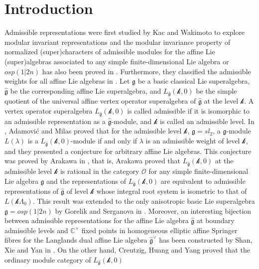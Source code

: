 \documentclass[12pt]{article}
\begin{document}
\section{Introduction}
Admissible representations were first studied by Kac and Wakimoto to explore modular invariant representations and
the modular invariance property of normalized (super)characters of admissible modules for
the affine Lie (super)algebras associated to any simple finite-dimensional Lie algebra or $osp(1|2n)$ has also been proved in \cite{KW88}.
Furthermore, they classified the admissible weights for all affine Lie algebras in \cite{KW89}.
Let $\mathfrak{g}$ be a basic classical Lie superalgebra, $\widehat{\mathfrak{g}}$ be the corresponding affine Lie superalgebra, and
$L_{\widehat{\mathfrak{g}}}(\mathcal{k},0)$ be the simple quotient of the universal affine vertex operator superalgebra of $\widehat{\mathfrak{g}}$
at the level $\mathcal{k}$.
A vertex operator superalgebra $L_{\widehat{\mathfrak{g}}}(\mathcal{k},0)$ is called admissible if it is isomorphic to an admissible representation as a $\widehat{\mathfrak{g}}$-module, and $\mathcal{k}$ is called an admissible level.
In \cite{AM95}, Adamovi\'{c} and Milas proved that for the admissible level $\mathcal{k}$, $\mathfrak{g}=sl_2$,
a $\widehat{\mathfrak{g}}$-module $L(\lambda)$ is a $L_{\widehat{\mathfrak{g}}}(\mathcal{k},0)$-module if and only if
$\lambda$ is an admissible weight of level $\mathcal{k}$,
and they presented a conjecture for arbitrary affine Lie algebras.
This conjecture was proved by Arakawa in \cite{Ar16}, that is,
Arakawa proved that $L_{\widehat{\mathfrak{g}}}(\mathcal{k},0)$ at the admissible level $\mathcal{k}$ is rational in the category $\mathcal{O}$
for any simple finite-dimensional Lie algebra $\mathfrak{g}$ and the representations of $L_{\widehat{\mathfrak{g}}}(\mathcal{k},0)$
are equivalent to admissible representations of $\widehat{\mathfrak{g}}$ of level $\mathcal{k}$ whose integral root system is isometric
to that of $L(\mathcal{k}\Lambda_0)$.
This result was extended to the only anisotropic basic Lie superalgebra $\mathfrak{g}=osp(1|2n)$ by Gorelik and Serganova in \cite{GS22}.
Moreover, an interesting bijection between admissible representations for the affine Lie algebra $\widehat{\mathfrak{g}}$ at boundary admissible levels and $\mathbb{C}^\times$ fixed points in homogeneous elliptic affine Springer fibres for the Langlands dual affine Lie algebra $\widehat{\mathfrak{g}}^\vee$
has been constructed by Shan, Xie and Yan in \cite{SXY24}.
On the other hand,
Creutzig, Huang and Yang proved that the ordinary module category of $L_{\widehat{\mathfrak{g}}}(\mathcal{k},0)$
\end{document}
